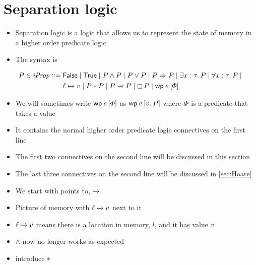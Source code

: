 \documentclass[thesis.tex]{subfiles}
\begin{document}
\section{Separation logic}
\label{sec:seplogic}
\begin{itemize}
  \item Separation logic is a logic that allows us to represent the state of memory in a higher order predicate logic
  \item The syntax is
\end{itemize}
\begin{align*}
  \prop \in \iProp \bnfdef{} & \FALSE \mid \TRUE \mid \prop \land \prop \mid \prop \lor \prop \mid \prop \Ra \prop \mid \Exists \var:\type. \prop \mid \All \var:\type. \prop \mid \\
                             & \loc \fmapsto \val \mid \prop * \prop \mid \prop \wand \prop \mid \always\prop \mid \wpre\expr{\pred}                                               \\
\end{align*}
\begin{itemize}
  \item We will sometimes write $\wpre\expr{\pred}$ as $\wpre\expr{\Ret\val. \prop}$ where $\varPhi$ is a predicate that takes a value
  \item It contains the normal higher order predicate logic connectives on the first line
  \item The first two connectives on the second line will be discussed in this section
  \item The last three connectives on the second line will be discussed in \cref*{sec:Hoare}
  \item We start with points to, $\fmapsto$
\end{itemize}
\begin{center}
\end{center}
\begin{itemize}
  \item Picture of memory with $\loc\fmapsto \val$ next to it
  \item $\loc\fmapsto\val$ means there is a location in memory, $l$, and it has value $v$
  \item $\land$ now no longer works as expected
  \item introduce ∗
\end{itemize}
\end{document}
